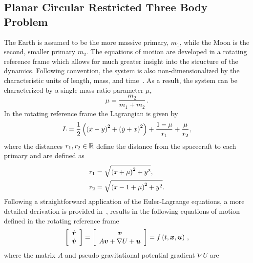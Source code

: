 \documentclass[smallcondensed]{svjour3}
\begin{document}
\subsection{Planar Circular Restricted Three Body Problem}\label{sec:pcrtbp}
The Earth is assumed to be the more massive primary, \( m_1 \), while the Moon is the second, smaller primary \( m_2\).
The equations of motion are developed in a rotating reference frame which allows for much greater insight into the structure of the dynamics.
Following convention, the system is also non-dimensionalized by the characteristic units of length, mass, and time~\cite{koon2011}.
As a result, the system can be characterized by a single mass ratio parameter \( \mu \),
\begin{equation}
        \mu = \frac{m_2}{m_1+m_2} \, .
        \label{eq:mass_param}
\end{equation}
In the rotating reference frame the Lagrangian is given by
\begin{equation}\label{eq:lagrangian}
    L = \frac{1}{2} \left( \left( \dot{x} - y \right)^2 + \left( \dot{y} + x \right)^2 \right) + \frac{1 - \mu}{r_1} + \frac{\mu}{r_2},
\end{equation}
where the distances \( r_1, r_2 \in \mathbb{R} \) define the distance from the spacecraft to each primary and are defined as
\begin{align}
    r_1 &= \sqrt{\left( x + \mu \right)^2 + y^2} , \\
    r_2 &= \sqrt{\left( x -1 + \mu \right)^2 + y^2} .
\end{align}
Following a straightforward application of the Euler-Lagrange equations, a more detailed derivation is provided in~\cite{szebehely1967}, results in the following equations of motion defined in the rotating reference frame
\begin{equation}\label{eqn:cont_dyn}
        \left[\begin{array}{c} \dot{\bm{r}} \\ \dot{\bm{v}} \end{array} \right] = 
        \left[ \begin{array}{c} \bm{v} \\ A \bm{v} + \nabla U + \bm{u} \end{array} \right] = f\left( t,\bm{x}, \bm{u}\right) \, ,
\end{equation}
where the matrix \( A \) and pseudo gravitational potential gradient \( \nabla U\) are
\end{document}
